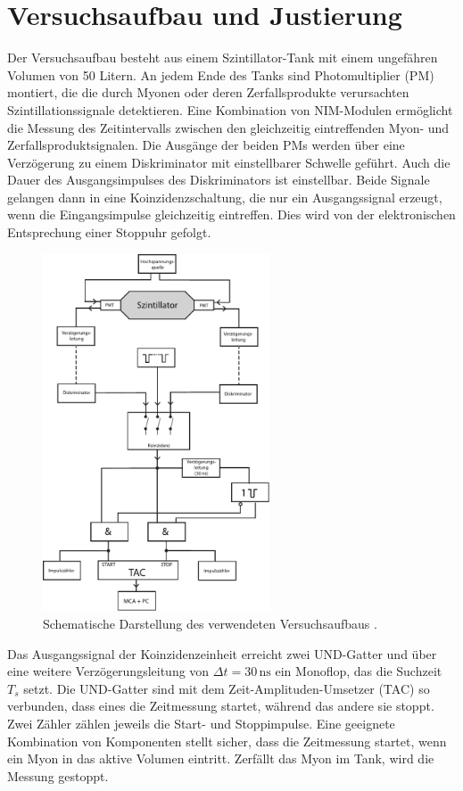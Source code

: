 \section{Versuchsaufbau und Justierung}

Der Versuchsaufbau besteht aus einem Szintillator-Tank mit einem ungefähren Volumen von 50 Litern. An jedem Ende des Tanks sind Photomultiplier (PM) montiert, die die durch Myonen oder deren Zerfallsprodukte verursachten Szintillationssignale detektieren. Eine Kombination von NIM-Modulen ermöglicht die Messung des Zeitintervalls zwischen den gleichzeitig eintreffenden Myon- und Zerfallsproduktsignalen. Die Ausgänge der beiden PMs werden über eine Verzögerung zu einem Diskriminator mit einstellbarer Schwelle geführt. Auch die Dauer des Ausgangsimpulses des Diskriminators ist einstellbar. Beide Signale gelangen dann in eine Koinzidenzschaltung, die nur ein Ausgangssignal erzeugt, wenn die Eingangsimpulse gleichzeitig eintreffen. Dies wird von der elektronischen Entsprechung einer Stoppuhr gefolgt.

\begin{figure}[H]
    \centering
    \includegraphics[width=0.6\textwidth]{content/grafik/Aufbau.pdf}
    \caption{Schematische Darstellung des verwendeten Versuchsaufbaus \cite{myon}.}
    \label{fig:Aufbau}
\end{figure}

Das Ausgangssignal der Koinzidenzeinheit erreicht zwei UND-Gatter und über eine weitere Verzögerungsleitung von $\Delta t = 30 \, \text{ns}$ ein Monoflop, das die Suchzeit $T_s$ setzt. Die UND-Gatter sind mit dem Zeit-Amplituden-Umsetzer (TAC) so verbunden, dass eines die Zeitmessung startet, während das andere sie stoppt. Zwei Zähler zählen jeweils die Start- und Stoppimpulse. Eine geeignete Kombination von Komponenten stellt sicher, dass die Zeitmessung startet, wenn ein Myon in das aktive Volumen eintritt. Zerfällt das Myon im Tank, wird die Messung gestoppt.

